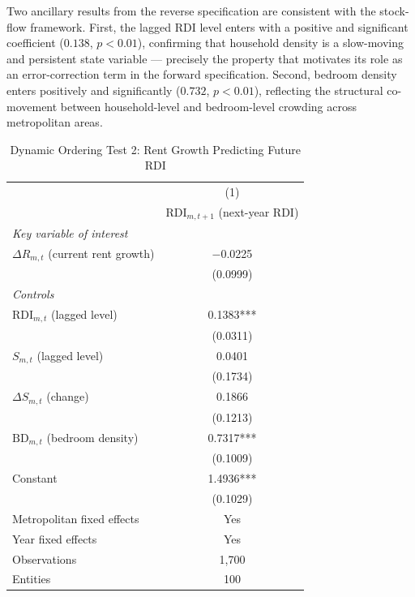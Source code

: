 \documentclass[pdflatex,sn-apa]{sn-jnl}%
\theoremstyle{thmstyleone}%
\theoremstyle{thmstyletwo}%
\theoremstyle{thmstylethree}%
\begin{document}
Two ancillary results from the reverse specification are consistent with the 
stock-flow framework. First, the lagged RDI level enters with a positive and 
significant coefficient ($0.138$, $p < 0.01$), confirming that household 
density is a slow-moving and persistent state variable --- precisely the 
property that motivates its role as an error-correction term in the forward 
specification. Second, bedroom density enters positively and significantly 
($0.732$, $p < 0.01$), reflecting the structural co-movement between 
household-level and bedroom-level crowding across metropolitan areas.

\begin{table}[htbp]
\centering
\caption{Dynamic Ordering Test 2: Rent Growth Predicting Future RDI}
\label{tab:dynamic_rev}
\begin{tabular}{lc}
\toprule
 & (1) \\
 & $\text{RDI}_{m,t+1}$ (next-year RDI) \\
\midrule
\textit{Key variable of interest} & \\
$\Delta R_{m,t}$ (current rent growth) & $-$0.0225 \\
                                        & (0.0999)  \\
\addlinespace
\textit{Controls} & \\
$\text{RDI}_{m,t}$ (lagged level)      & 0.1383*** \\
                                        & (0.0311)  \\
$S_{m,t}$ (lagged level)               & 0.0401 \\
                                        & (0.1734)  \\
$\Delta S_{m,t}$ (change)              & 0.1866 \\
                                        & (0.1213)  \\
$\text{BD}_{m,t}$ (bedroom density)    & 0.7317*** \\
                                        & (0.1009)  \\
\addlinespace
Constant                                & 1.4936*** \\
                                        & (0.1029)  \\
\midrule
Metropolitan fixed effects              & Yes \\
Year fixed effects                      & Yes \\
Observations                            & 1,700 \\
Entities                                & 100 \\

\end{tabular}
\end{table}
\end{document}
